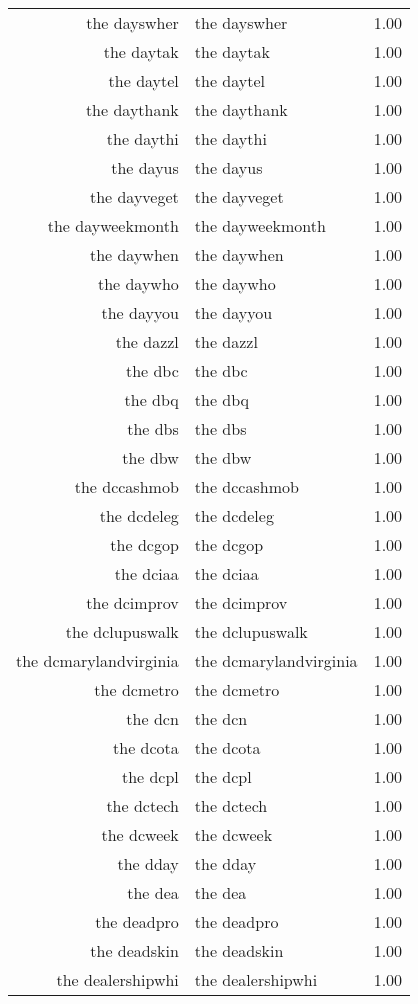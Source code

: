 \begin{table}[ht]
\begin{tabular}{rlr}
  the dayswher & the dayswher & 1.00 \\ 
  the daytak & the daytak & 1.00 \\ 
  the daytel & the daytel & 1.00 \\ 
  the daythank & the daythank & 1.00 \\ 
  the daythi & the daythi & 1.00 \\ 
  the dayus & the dayus & 1.00 \\ 
  the dayveget & the dayveget & 1.00 \\ 
  the dayweekmonth & the dayweekmonth & 1.00 \\ 
  the daywhen & the daywhen & 1.00 \\ 
  the daywho & the daywho & 1.00 \\ 
  the dayyou & the dayyou & 1.00 \\ 
  the dazzl & the dazzl & 1.00 \\ 
  the dbc & the dbc & 1.00 \\ 
  the dbq & the dbq & 1.00 \\ 
  the dbs & the dbs & 1.00 \\ 
  the dbw & the dbw & 1.00 \\ 
  the dccashmob & the dccashmob & 1.00 \\ 
  the dcdeleg & the dcdeleg & 1.00 \\ 
  the dcgop & the dcgop & 1.00 \\ 
  the dciaa & the dciaa & 1.00 \\ 
  the dcimprov & the dcimprov & 1.00 \\ 
  the dclupuswalk & the dclupuswalk & 1.00 \\ 
  the dcmarylandvirginia & the dcmarylandvirginia & 1.00 \\ 
  the dcmetro & the dcmetro & 1.00 \\ 
  the dcn & the dcn & 1.00 \\ 
  the dcota & the dcota & 1.00 \\ 
  the dcpl & the dcpl & 1.00 \\ 
  the dctech & the dctech & 1.00 \\ 
  the dcweek & the dcweek & 1.00 \\ 
  the dday & the dday & 1.00 \\ 
  the dea & the dea & 1.00 \\ 
  the deadpro & the deadpro & 1.00 \\ 
  the deadskin & the deadskin & 1.00 \\ 
  the dealershipwhi & the dealershipwhi & 1.00 \\ 

\end{tabular}
\end{table}

